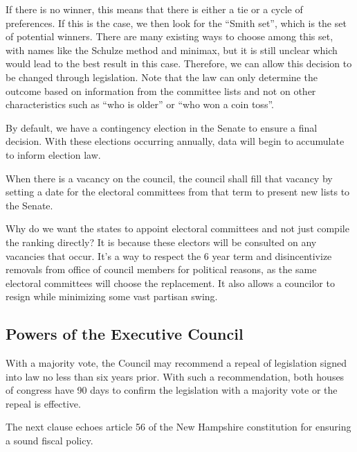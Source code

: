 \documentclass{article}
\begin{document}
If there is no winner, this means that there is either a tie or a cycle of preferences. If this is the case, we then look for the “Smith set”\cite{Smith_Set}, which is the set of potential winners. There are many existing ways to choose among this set, with names like the Schulze method\cite{Schulze} and minimax, but it is still unclear which would lead to the best result in this case. Therefore, we can allow this decision to be changed through legislation. Note that the law can only determine the outcome based on information from the committee lists and not on other characteristics such as “who is older” or “who won a coin toss”.

By default, we have a contingency election in the Senate to ensure a final decision. With these elections occurring annually, data will begin to accumulate to inform election law.

\begin{quoting}
When there is a vacancy on the council, the council shall fill that vacancy by setting a date for the electoral committees from that term to present new lists to the Senate.
\end{quoting}

Why do we want the states to appoint electoral committees and not just compile the ranking directly? It is because these electors will be consulted on any vacancies that occur. It’s a way to respect the 6 year term and disincentivize removals from office of council members for political reasons, as the same electoral committees will choose the replacement. It also allows a councilor to resign while minimizing some vast partisan swing.

\subsection{Powers of the Executive Council}

\begin{quoting}
With a majority vote, the Council may recommend a repeal of legislation signed into law no less than six years prior. With such a recommendation, both houses of congress have 90 days to confirm the legislation with a majority vote or the repeal is effective.
\end{quoting}

The next clause echoes article 56 of the New Hampshire constitution\cite{New Hampshire Constitution} for ensuring a sound fiscal policy.
\end{document}
